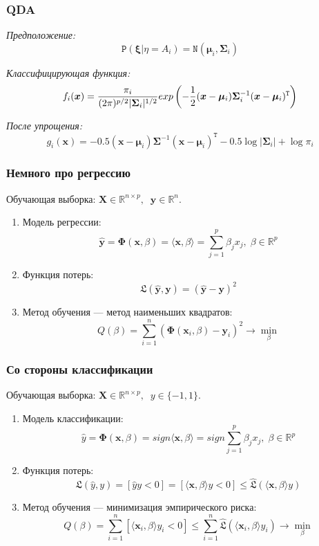 \documentclass[11pt]{beamer}
\begin{document}
	\begin{frame}
		\frametitle{QDA}
		\textit{Предположение:}	
		$$\mathtt{P}(\bm{\xi}|\eta = A_i) = \mathtt{N}(\bm{\mu}_i, \bm{\Sigma}_i)$$
		
		\textit{Классифицирующая функция:}
		$$f_i(\bm{x}) = {{\pi_i}\over{(2\pi)^{p/2}|\bm{\Sigma}_i|^{1/2}}}exp\left(-{{1}\over{2}}(\bm{x} - \bm{\mu}_i)\bm{\Sigma}_i^{-1}(\bm{x} - \bm{\mu}_i)^\mathtt{T}\right)$$
		
		\textit{После упрощения:}
		$$g_i(\bm{x}) = -0.5 (\bm{x} - \bm{\mu}_i)\bm{\Sigma}^{-1}(\bm{x} - \bm{\mu}_i)^\mathtt{T} - 0.5\log|\bm{\Sigma}_i| + \log\pi_i$$
		
	\end{frame}

	\begin{frame}
		\frametitle{Немного про регрессию}
		Обучающая выборка: $\bm{X} \in \mathbb{R}^{n \times p}, \;\;\mathbf{y}\in \mathbb{R}^n$.
		
		\begin{enumerate}
			\item Модель регрессии:
			$$ \hat{\bm{y}} = \bm{\Phi}(\bm{x}, \beta) = \langle \bm{x}, \beta \rangle = \sum\limits_{j=1}^{p} \beta_j x_j , \; \beta \in \mathbb{R}^p$$
			
			\item Функция потерь:
			$$ \mathfrak{L}(\hat{\bm{y}}, \bm{y}) = (\hat{\bm{y}} - \bm{y})^2$$
			
			
			\item Метод обучения --- метод наименьших квадратов:
			$$ Q(\beta) = \sum\limits_{i = 1}^{n} (\bm{\Phi}(\bm{x}_i, \beta) - \bm{y}_i)^2 \rightarrow \min\limits_{\beta} $$
			
		\end{enumerate}
	\end{frame}
	
	
	\begin{frame}
		\frametitle{Со стороны классификации}
		Обучающая выборка: $\bm{X} \in \mathbb{R}^{n\times p}, \;\; y \in \{-1, 1\}$.
		
		\begin{enumerate}
			\item Модель классификации:
			$$ \hat{y} = \bm{\Phi}(\bm{x}, \beta) = sign \langle \bm{x}, \beta \rangle = sign \sum\limits_{j=1}^{p} \beta_j x_j , \; \beta \in \mathbb{R}^p$$
			
			\item Функция потерь:
			$$ \mathfrak{L}(\hat{y}, y) = [\hat{y} y < 0] = [ \langle \bm{x}, \beta \rangle y < 0 ] \leqslant \hat{\mathfrak{L}}( \langle \bm{x}, \beta \rangle y) $$
			
			
			\item Метод обучения --- минимизация эмпирического риска:
			$$ Q(\beta) = \sum\limits_{i = 1}^{n} [\langle \bm{x}_i, \beta \rangle y_i < 0] \leqslant \sum\limits_{i = 1}^{n} \hat{\mathfrak{L}}( \langle \bm{x}_i, \beta \rangle y_i)  \rightarrow \min\limits_{\beta} $$
			
		\end{enumerate}
	\end{frame}
\end{document}
